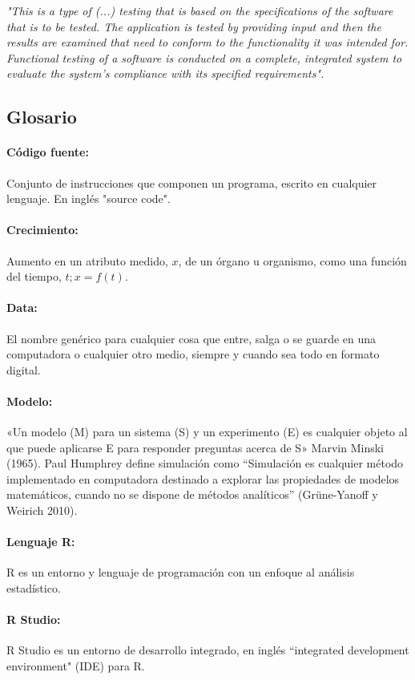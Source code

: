\textit{"This is a type of (...) testing that is based on the specifications of the software that is to be tested. The application is tested by providing input and then the results are examined that need to conform to the functionality it was intended for. Functional testing of a software is conducted on a complete, integrated system to evaluate the system’s compliance with its specified requirements".}

\subsection{Glosario}

\paragraph{Código fuente:} Conjunto de instrucciones que componen un programa, escrito en cualquier lenguaje. En inglés "source code".
\paragraph{Crecimiento:} Aumento en un atributo medido, $x$, de un \'organo u organismo, como una funci\'on del tiempo, $t;x = f (t)$.
\paragraph{Data:} El nombre genérico para cualquier cosa que entre, salga o se guarde en una computadora o cualquier otro medio, siempre y cuando sea todo en formato digital.
\paragraph{Modelo:} «Un modelo (M) para un sistema (S) y un experimento (E) es cualquier objeto al que puede aplicarse E para responder preguntas acerca de S» Marvin Minski (1965). Paul Humphrey define simulación como “Simulación es cualquier método implementado en computadora destinado a explorar las propiedades de modelos matemáticos, cuando no se dispone de métodos analíticos” (Grüne-Yanoff y Weirich 2010).
\paragraph{Lenguaje R:} R es un entorno y lenguaje de programaci\'on con un enfoque al an\'alisis estad\'istico.
\paragraph{R Studio:} R Studio es un entorno de desarrollo integrado, en ingl\'es ``integrated development environment" (IDE) para R.


